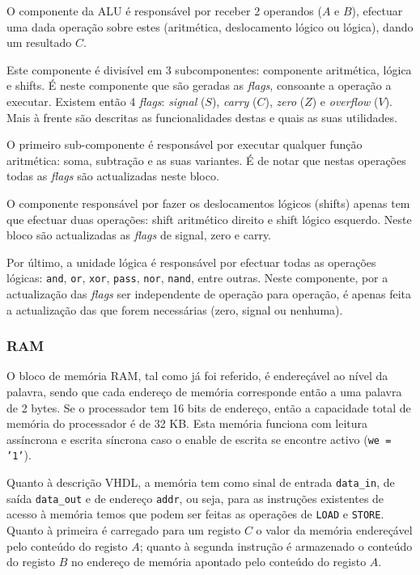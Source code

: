 \documentclass[a4paper]{article}
\begin{document}
				O componente da ALU é responsável por receber 2 operandos ($A$ e $B$), efectuar uma dada operação sobre estes (aritmética, deslocamento lógico ou lógica), dando um resultado $C$.
				
				Este componente é divisível em 3 subcomponentes: componente aritmética, lógica e shifts. É neste componente que são geradas as \textit{flags}, consoante a operação a executar. Existem então 4 \textit{flags}: \textit{signal} ($S$), \textit{carry} ($C$), \textit{zero} ($Z$) e \textit{overflow} ($V$). Mais à frente são descritas as funcionalidades destas e quais as suas utilidades.
				
				O primeiro sub-componente é responsável por executar qualquer função aritmética: soma, subtração e as suas variantes. É de notar que nestas operações todas as \textit{flags} são actualizadas neste bloco.
				
				O componente responsável por fazer os deslocamentos lógicos (shifts) apenas tem que efectuar duas operações: shift aritmético direito e shift lógico esquerdo. Neste bloco são actualizadas as \textit{flags} de signal, zero e carry.
				
				Por último, a unidade lógica é responsável por efectuar todas as operações lógicas: \texttt{and}, \texttt{or}, \texttt{xor}, \texttt{pass}, \texttt{nor}, \texttt{nand}, entre outras. Neste componente, por a actualização das \textit{flags} ser independente de operação para operação, é apenas feita a actualização das que forem necessárias (zero, signal ou nenhuma).
			
			\subsubsection{RAM}
				
				O bloco de memória RAM, tal como já foi referido, é endereçável ao nível da palavra, sendo que cada endereço de memória corresponde então a uma palavra de 2 bytes. Se o processador tem 16 bits de endereço, então a capacidade total de memória do processador é de 32 KB. Esta memória funciona com leitura assíncrona e escrita síncrona caso o enable de escrita se encontre activo (\texttt{we = '1'}).
				
				Quanto à descrição VHDL, a memória tem como sinal de entrada \texttt{data\_in}, de saída \texttt{data\_out} e de endereço \texttt{addr}, ou seja, para as instruções existentes de acesso à memória temos que podem ser feitas as operações de \texttt{LOAD} e \texttt{STORE}. Quanto à primeira é carregado para um registo $C$ o valor da memória endereçável pelo conteúdo do registo $A$; quanto à segunda instrução é armazenado o conteúdo do registo $B$ no endereço de memória apontado pelo conteúdo do registo $A$.
				
\end{document}
